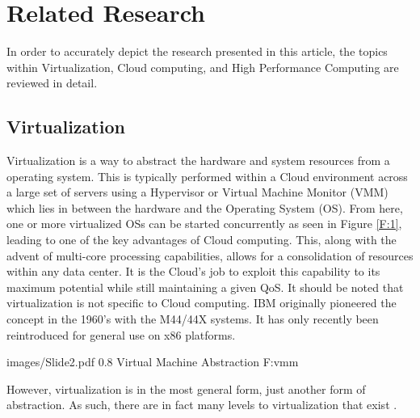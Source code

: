 
\chapter{Related Research}
\label{chap:related}

In order to accurately depict the research presented in this article, the topics within Virtualization,  Cloud computing, and High Performance Computing are reviewed in detail. 

\section{Virtualization}
\label{sec:virtualization}


Virtualization is a way to abstract the hardware and system resources from a operating system.  This is typically performed  within a Cloud environment across a large set of servers using a Hypervisor or Virtual Machine Monitor (VMM) which lies in between the hardware and the Operating System (OS). From here, one or more virtualized OSs can be started concurrently as seen in Figure \ref{F:1}, leading to one of the key advantages of Cloud computing.  This, along with the advent of multi-core processing capabilities, allows for a consolidation of resources within any data center.  It is the Cloud's job to exploit this capability to its maximum potential while still maintaining a given QoS. It should be noted that virtualization is not specific to Cloud computing. IBM originally pioneered the concept in the 1960's with the M44/44X systems.  It has only recently been reintroduced for general use on x86 platforms. 


  {images/Slide2.pdf}
  {0.8}
  {Virtual Machine Abstraction}
  {F:vmm}
 

However, virtualization is in the most general form, just another form of abstraction. As such, there are in fact many levels to virtualization that exist \cite{hwang2013distributed}. 


